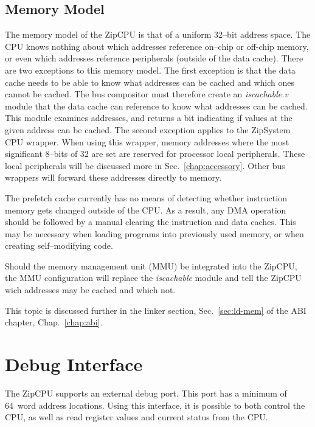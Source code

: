 \documentclass{gqtekspec}
\begin{document}
\subsection{Memory Model}\label{ssec:memory}
The memory model of the ZipCPU is that of a uniform 32--bit address space.
The CPU knows nothing about which addresses reference on--chip or off-chip
memory, or even which addresses reference peripherals (outside of the data
cache).  There are two exceptions to this memory model.  The first exception
is that the data cache needs to be able to know what addresses can be
cached and which ones cannot be cached.  The bus compositor must therefore
create an {\em iscachable.v} module that the data cache can reference to
know what addresses can be cached.  This module examines addresses, and
returns a bit indicating if values at the given address can be cached.
The second exception applies to the ZipSystem CPU wrapper.  When using this
wrapper, memory addresses where the most significant 8--bits of 32
are set are reserved for processor local peripherals.  These local
peripherals will be discussed more in Sec.~\ref{chap:accessory}.  Other
bus wrappers will forward these addresses directly to memory.

The prefetch cache currently has no means of detecting whether instruction
memory gets changed outside of the CPU.  As a result, any DMA operation should
be followed by a manual clearing the instruction and data caches.  This may
be necessary when loading programs into previously used memory, or when
creating self--modifying code.

Should the memory management unit (MMU) be integrated into the ZipCPU, the MMU
configuration will replace the {\em iscachable} module and tell the ZipCPU
wich addresses may be cached and which not.

This topic is discussed further in the linker section, Sec.~\ref{sec:ld-mem}
of the ABI chapter, Chap.~\ref{chap:abi}.

\section{Debug Interface}\label{sec:debug}
The ZipCPU supports an external debug port.  This port has a minimum of
64~word address locations.  Using this interface, it is possible to both
control the CPU, as well as read register values and current status from the
CPU.
\end{document}
